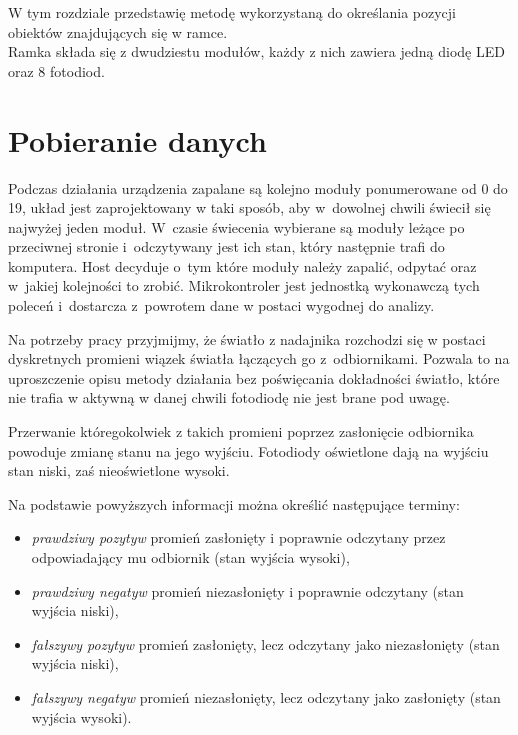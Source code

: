 \label{ch:method}

W tym rozdziale przedstawię metodę wykorzystaną do określania pozycji obiektów znajdujących się w ramce.\\

Ramka składa się z dwudziestu modułów, każdy z nich zawiera jedną diodę LED oraz 8 fotodiod.\\

\section{Pobieranie danych}

Podczas działania urządzenia zapalane są kolejno moduły ponumerowane od 0 do 19, układ jest zaprojektowany w taki sposób, aby w~dowolnej chwili świecił się najwyżej jeden moduł. W~czasie świecenia wybierane są moduły leżące po przeciwnej stronie i~odczytywany jest ich stan, który następnie trafi do komputera. Host decyduje o~tym które moduły należy zapalić, odpytać oraz w~jakiej kolejności to zrobić. Mikrokontroler jest jednostką wykonawczą tych poleceń i~dostarcza z~powrotem dane w postaci wygodnej do analizy.

Na potrzeby pracy przyjmijmy, że światło z nadajnika rozchodzi się w postaci dyskretnych promieni \pauza wiązek światła łączących go z~odbiornikami. Pozwala to na uproszczenie opisu metody działania bez poświęcania dokładności \pauza światło, które nie trafia w aktywną w danej chwili fotodiodę nie jest brane pod uwagę.

Przerwanie któregokolwiek z takich promieni poprzez zasłonięcie odbiornika powoduje zmianę stanu na jego wyjściu. Fotodiody oświetlone dają na wyjściu stan niski, zaś nieoświetlone \ppauza wysoki.

Na podstawie powyższych informacji można określić następujące terminy:

\begin{itemize}
 \item \textit{prawdziwy pozytyw} \pauza promień zasłonięty i poprawnie odczytany przez odpowiadający mu odbiornik (stan wyjścia wysoki),
 \item \textit{prawdziwy negatyw} \pauza promień niezasłonięty i poprawnie odczytany (stan wyjścia niski),
 \item \textit{fałszywy pozytyw} \pauza promień zasłonięty, lecz odczytany jako niezasłonięty (stan wyjścia niski),
 \item \textit{fałszywy negatyw} \pauza promień niezasłonięty, lecz odczytany jako zasłonięty (stan wyjścia wysoki).
\end{itemize}

